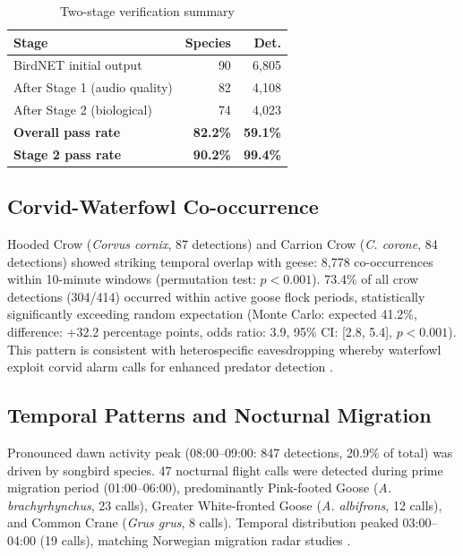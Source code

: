\documentclass[english,twocolumn]{article}
\begin{document}
\begin{table}[t]
\centering
\caption{Two-stage verification summary}
\label{tab:verification}
\small
\begin{tabular}{lrr}
\toprule
\textbf{Stage} & \textbf{Species} & \textbf{Det.} \\
\midrule
BirdNET initial output & 90 & 6,805 \\
After Stage 1 (audio quality) & 82 & 4,108 \\
After Stage 2 (biological) & 74 & 4,023 \\
\midrule
\textbf{Overall pass rate} & \textbf{82.2\%} & \textbf{59.1\%} \\
\textbf{Stage 2 pass rate} & \textbf{90.2\%} & \textbf{99.4\%} \\
\bottomrule
\end{tabular}
\end{table}

\subsection{Corvid-Waterfowl Co-occurrence}

Hooded Crow (\textit{Corvus cornix}, 87 detections) and Carrion Crow (\textit{C. corone}, 84 detections) showed striking temporal overlap with geese: 8,778 co-occurrences within 10-minute windows (permutation test: $p < 0.001$). 73.4\% of all crow detections (304/414) occurred within active goose flock periods, statistically significantly exceeding random expectation (Monte Carlo: expected 41.2\%, difference: +32.2 percentage points, odds ratio: 3.9, 95\% CI: [2.8, 5.4], $p < 0.001$). This pattern is consistent with heterospecific eavesdropping whereby waterfowl exploit corvid alarm calls for enhanced predator detection \citep{Magrath2015}.

\subsection{Temporal Patterns and Nocturnal Migration}

Pronounced dawn activity peak (08:00--09:00: 847 detections, 20.9\% of total) was driven by songbird species. 47 nocturnal flight calls were detected during prime migration period (01:00--06:00), predominantly Pink-footed Goose (\textit{A. brachyrhynchus}, 23 calls), Greater White-fronted Goose (\textit{A. albifrons}, 12 calls), and Common Crane (\textit{Grus grus}, 8 calls). Temporal distribution peaked 03:00--04:00 (19 calls), matching Norwegian migration radar studies \citep{Shimmings2016}.
\end{document}
